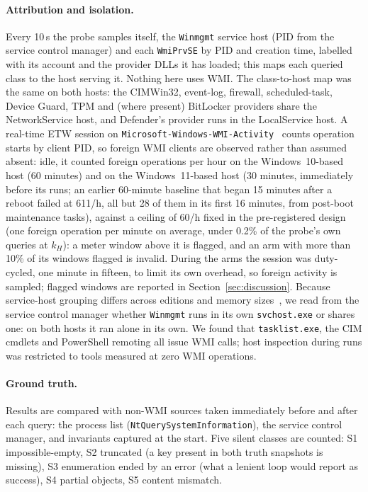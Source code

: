 \documentclass[letterpaper,twocolumn,10pt]{article}
\newcommand{\code}[1]{\texttt{\small #1}}
\begin{document}
\paragraph{Attribution and isolation.}
Every 10\,s the probe samples itself, the \code{Winmgmt} service host (PID from the service control manager) and each \code{WmiPrvSE} by PID and creation time, labelled with its account and the provider DLLs it has loaded; this maps each queried class to the host serving it.
Nothing here uses WMI.
The class-to-host map was the same on both hosts: the CIMWin32, event-log, firewall, scheduled-task, Device Guard, TPM and (where present) BitLocker providers share the NetworkService host, and Defender's provider runs in the LocalService host.
A real-time ETW session on \code{Microsoft-Windows-WMI-Activity}~\cite{ms-tracing} counts operation starts by client PID, so foreign WMI clients are observed rather than assumed absent: idle, it counted \WaIdle{} foreign operations per hour on the Windows~10-based host (60 minutes) and \WcIdle{} on the Windows~11-based host (30 minutes, immediately before its runs; an earlier 60-minute baseline that began 15 minutes after a reboot failed at 611/h, all but 28 of them in its first 16 minutes, from post-boot maintenance tasks), against a ceiling of 60/h fixed in the pre-registered design (one foreign operation per minute on average, under 0.2\% of the probe's own queries at $k_H$): a meter window above it is flagged, and an arm with more than 10\% of its windows flagged is invalid.
During the arms the session was duty-cycled, one minute in fifteen, to limit its own overhead, so foreign activity is sampled; flagged windows are reported in Section~\ref{sec:discussion}.
Because service-host grouping differs across editions and memory sizes~\cite{ms-svchost}, we read from the service control manager whether \code{Winmgmt} runs in its own \code{svchost.exe} or shares one: on both hosts it ran alone in its own.
We found that \code{tasklist.exe}, the CIM cmdlets and PowerShell remoting all issue WMI calls; host inspection during runs was restricted to tools measured at zero WMI operations.

\paragraph{Ground truth.}
Results are compared with non-WMI sources taken immediately before and after each query: the process list (\code{NtQuerySystemInformation}), the service control manager, and invariants captured at the start.
Five silent classes are counted: S1 impossible-empty, S2 truncated (a key present in both truth snapshots is missing), S3 enumeration ended by an error (what a lenient loop would report as success), S4 partial objects, S5 content mismatch.
\end{document}
